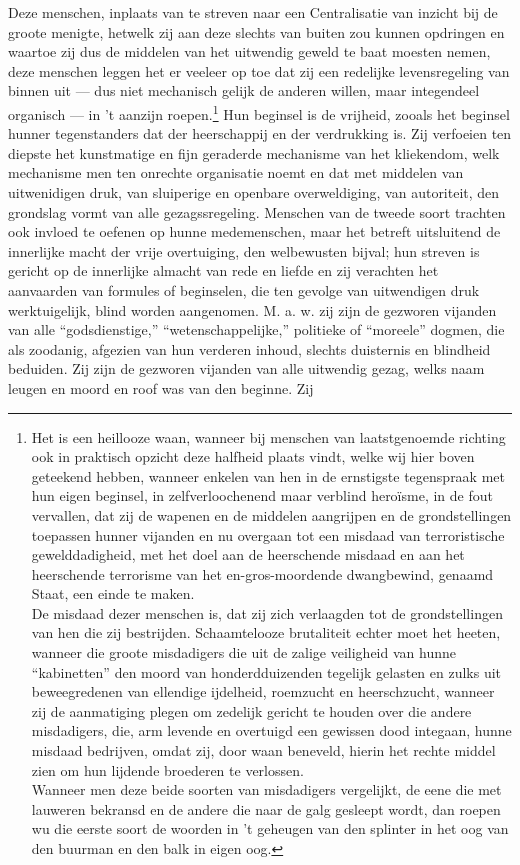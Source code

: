 \documentclass[a4paper, 12pt, oneside, dutch]{article}
\begin{document}
Deze menschen, inplaats van te streven naar een Centralisatie van inzicht bij de groote menigte, hetwelk zij aan deze slechts van buiten zou kunnen opdringen en waartoe zij dus de middelen van het uitwendig geweld te baat moesten nemen, deze menschen leggen het er veeleer op toe dat zij een redelijke levensregeling van binnen uit --- dus niet mechanisch gelijk de anderen willen, maar integendeel organisch --- in 't aanzijn roepen.\footnote{Het is een heillooze waan, wanneer bij menschen van laatstgenoemde richting ook in praktisch opzicht deze halfheid plaats vindt, welke wij hier boven geteekend hebben, wanneer enkelen van hen in de ernstigste tegenspraak met hun eigen beginsel, in zelfverloochenend maar verblind heroïsme, in de fout vervallen, dat zij de wapenen en de middelen aangrijpen en de grondstellingen toepassen hunner vijanden en nu overgaan tot een misdaad van terroristische gewelddadigheid, met het doel aan de heerschende misdaad en aan het heerschende terrorisme van het en-gros-moordende dwangbewind, genaamd Staat, een einde te maken.\\\hspace*{5mm}De misdaad dezer menschen is, dat zij zich verlaagden tot de grondstellingen van hen die zij bestrijden. Schaamtelooze brutaliteit echter moet het heeten, wanneer die groote misdadigers die uit de zalige veiligheid van hunne "`kabinetten"' den moord van honderdduizenden tegelijk gelasten en zulks uit beweegredenen van ellendige ijdelheid, roemzucht en heerschzucht, wanneer zij de aanmatiging plegen om zedelijk gericht te houden over die andere misdadigers, die, arm levende en overtuigd een gewissen dood integaan, hunne misdaad bedrijven, omdat zij, door waan beneveld, hierin het rechte middel zien om hun lijdende broederen te verlossen.\\\hspace*{5mm}Wanneer men deze beide soorten van misdadigers vergelijkt, de eene die met lauweren bekransd en de andere die naar de galg gesleept wordt, dan roepen wu die eerste soort de woorden in 't geheugen van den splinter in het oog van den buurman en den balk in eigen oog.} Hun beginsel is de vrijheid, zooals het beginsel hunner tegenstanders dat der heerschappij en der verdrukking is. Zij verfoeien ten diepste het kunstmatige en fijn geraderde mechanisme van het kliekendom, welk mechanisme men ten onrechte organisatie noemt en dat met middelen van uitwenidigen druk, van sluiperige en openbare overweldiging, van autoriteit, den grondslag vormt van alle gezagssregeling. Menschen van de tweede soort trachten ook invloed te oefenen op hunne medemenschen, maar het betreft uitsluitend de innerlijke macht der vrije overtuiging, den welbewusten bijval; hun streven is gericht op de innerlijke almacht van rede en liefde en zij verachten het aanvaarden van formules of beginselen, die ten gevolge van uitwendigen druk werktuigelijk, blind worden aangenomen. M. a. w. zij zijn de gezworen vijanden van alle "`godsdienstige,"' "`wetenschappelijke,"' politieke of "`moreele"' dogmen, die als zoodanig, afgezien van hun verderen inhoud, slechts duisternis en blindheid beduiden. Zij zijn de gezworen vijanden van alle uitwendig gezag, welks naam leugen en moord en roof was van den beginne. Zij 
\end{document}
